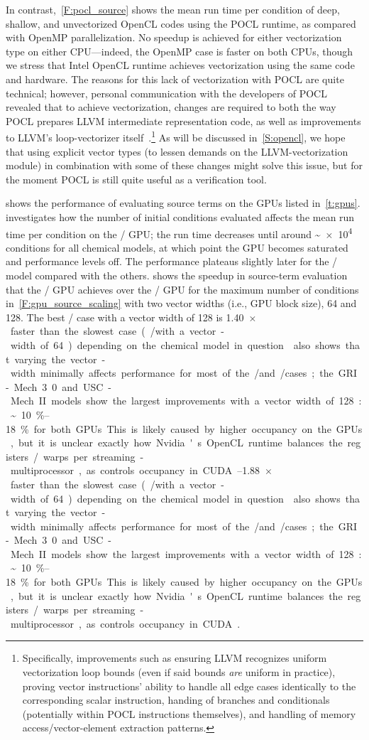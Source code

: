 \documentclass[12pt,number,sort&compress,preprint]{elsarticle}
\begin{document}
In contrast,~\cref{F:pocl_source} shows the mean run time per condition of deep, shallow, and unvectorized OpenCL codes using the POCL runtime, as compared with OpenMP parallelization.
No speedup is achieved for either vectorization type on either CPU---indeed, the OpenMP case is faster on both CPUs, though we stress that Intel OpenCL runtime achieves vectorization using the same code and hardware.
The reasons for this lack of vectorization with POCL are quite technical; however, personal communication with the developers of POCL revealed that to achieve vectorization, changes are required to both the way POCL prepares LLVM intermediate representation code, as well as improvements to LLVM's loop-vectorizer itself~\cite{pocl_communication}.\footnote{Specifically, improvements such as ensuring LLVM recognizes uniform vectorization loop bounds (even if said bounds \textit{are} uniform in practice), proving vector instructions' ability to handle all edge cases identically to the corresponding scalar instruction, handing of branches and conditionals (potentially within POCL instructions themselves), and handling of memory access\slash vector-element extraction patterns.}
As will be discussed in~\cref{S:opencl}, we hope that using explicit vector types (to lessen demands on the LLVM-vectorization module) in combination with some of these changes might solve this issue, but for the moment POCL is still quite useful as a verification tool.

 shows the performance of evaluating source terms on the GPUs listed in~\cref{t:gpus}.
 investigates how the number of initial conditions evaluated affects the mean run time per condition on the \gpunew/ GPU;
the run time decreases until around \textasciitilde\num{e4} conditions for all chemical models, at which point the GPU becomes saturated and performance levels off.
The performance plateaus slightly later for the \slash{} model compared with the others.
 shows the speedup in source-term evaluation that the \gpunew/ GPU achieves over the \gpuold/ GPU for the maximum number of conditions in~\cref{F:gpu_source_scaling} with two vector widths (i.e., GPU block size), \num{64} and \num{128}.
The best \gpunew/ case with a vector width of 128 is \SIrange{1.40}{1.88}{$\times$} faster than the slowest case (\gpuold/ with a vector-width of 64) depending on the chemical model in question.
 also shows that varying the vector-width minimally affects performance for most of the \gpunew/ and \gpuold/ cases; the GRI-Mech 3.0 and USC-Mech II models show the largest improvements with a vector width of 128: \textasciitilde\SIrange{10}{18}{\percent} for both GPUs.
This is likely caused by higher occupancy on the GPUs, but it is unclear exactly how Nvidia's OpenCL runtime balances the registers\slash warps per streaming-multiprocessor, as controls occupancy in CUDA~\cite{occupancy}.
\end{document}
